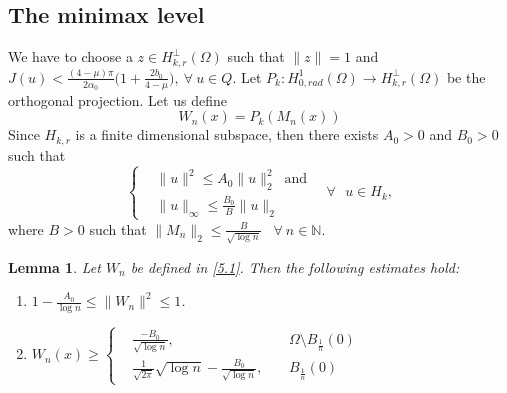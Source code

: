\documentclass[11pt]{amsart}
\numberwithin{equation}{section}
\newtheorem{lem}[thm]{Lemma}
\newcommand{\hr}{H^1_{0, rad}(\Omega)}
\newcommand{\1}{\frac{1}{2}}
\begin{document}
	\subsection{The minimax level}
	We have to choose a $z\in H_{k,r}^\perp(\Omega)$ such that $\|z\|=1$ and $J(u) < \frac{(4-\mu)\pi}{2\alpha_0}\Big( 1+\frac{2b_0}{4-\mu}\Big), \ \forall \ u \in Q.$ Let $P_k: \hr \rightarrow H_{k,r}^\perp(\Omega)$ be the orthogonal projection. Let us define 
	\begin{equation} \label{5.1}
		W_n(x) = P_k(M_n(x))
	\end{equation} 
	Since $H_{k,r}$ is a finite dimensional subspace, then there exists $A_0>0$ and $B_0>0$ such that
	\begin{equation}
		\label{5.2}
		\left\{ 
		\begin{aligned}
			&\|u\|^2 \leq A_0 \|u\|^2_2 \ \text{ and }\\
			&\|u\|_\infty \leq \frac{B_0}{B} \|u\|_2 
		\end{aligned} 
		\  \ \ \forall\ \ \ u\in H_k,
		\right.
	\end{equation}
	where $B >0$ such that $\|M_n\|_2 \leq \frac{B}{\sqrt{\log{n}}}$ \ $\forall \ n\in \mathbb{N}$.
	\begin{lem}
		\label{lem5.4}
		Let $W_n$ be defined in \eqref{5.1}. Then the following estimates hold:
		\begin{enumerate}
			\item [(i)] $1 - \frac{A_0}{\log{n}} \leq \|W_n\|^2 \leq 1$.
			\item [(ii)] $W_n(x) \geq \left\{ 
			\begin{aligned}
				&\frac{-B_0}{\sqrt{\log{n}}},  &&\ \Omega\setminus B_{\frac{1}{n}}(0)\\
				& \frac{1}{\sqrt{2\pi}}\sqrt{\log{n}}- \frac{B_0}{\sqrt{\log{n}}}, && \ B_{\frac{1}{n}}(0)
			\end{aligned}\right. $
		\end{enumerate}
	\end{lem}
\end{document}
